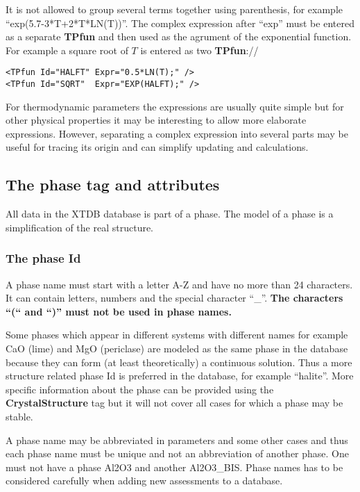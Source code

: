 \documentclass{article}
\begin{document}
It is not allowed to group several terms together using parenthesis,
for example ``exp(5.7-3*T+2*T*LN(T))''.  The complex expression after
``exp'' must be entered as a separate {\bf TPfun} and then used as the
agrument of the exponential function.  For example a square root of
$T$ is entered as two {\bf TPfun}://
\begin{verbatim}
<TPfun Id="HALFT" Expr="0.5*LN(T);" />
<TPfun Id="SQRT"  Expr="EXP(HALFT);" />
\end{verbatim}

For thermodynamic parameters the expressions are usually quite simple
but for other physical properties it may be interesting to allow more
elaborate expressions.  However, separating a complex expression into
several parts may be useful for tracing its origin and can simplify
updating and calculations.
  
\subsection{The phase tag and attributes}\label{sec:phasetag}

All data in the XTDB database is part of a phase.  The model of a
phase is a simplification of the real structure.

\subsubsection{The phase Id}\label{sec:phaseid}

A phase name must start with a letter A-Z and have no more than 24
characters.  It can contain letters, numbers and the special character
``\_''.  {\bf The characters ``(`` and ``)'' must not be used in phase
  names.}   

Some phases which appear in different systems with different names for
example CaO (lime) and MgO (periclase) are modeled as the same phase
in the database because they can form (at least theoretically) a
continuous solution.  Thus a more structure related phase {\rm Id} is
preferred in the database, for example ``halite''.  More specific
information about the phase can be provided using the {\bf
  CrystalStructure} tag but it will not cover all cases for which a
phase may be stable.

A phase name may be abbreviated in parameters and some other cases and
thus each phase name must be unique and not an abbreviation of another
phase.  One must not have a phase Al2O3 and another Al2O3\_BIS.  Phase
names has to be considered carefully when adding new assessments to a
database.
\end{document}
